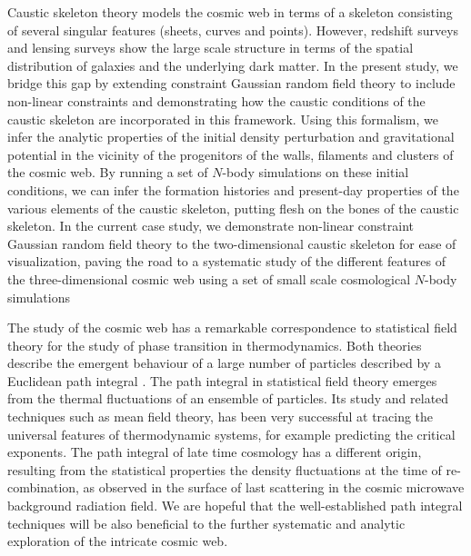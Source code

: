 \documentclass[a4paper, 11pt]{article}
\begin{document}
Caustic skeleton theory models the cosmic web in terms of a skeleton consisting of several singular features (sheets, curves and points). However, redshift surveys and lensing surveys show the large scale structure in terms of the spatial distribution of galaxies and the underlying dark matter. In the present study, we bridge this gap by extending constraint Gaussian random field theory to include non-linear constraints and demonstrating how the caustic conditions of the caustic skeleton are incorporated in this framework. Using this formalism, we infer the analytic properties of the initial density perturbation and gravitational potential in the vicinity of the progenitors of the walls, filaments and clusters of the cosmic web. By running a set of $N$-body simulations on these initial conditions, we can infer the formation histories and present-day properties of the various elements of the caustic skeleton, putting flesh on the bones of the caustic skeleton. In the current case study, we demonstrate non-linear constraint Gaussian random field theory to the two-dimensional caustic skeleton for ease of visualization, paving the road to a systematic study of the different features of the three-dimensional cosmic web using a set of small scale cosmological $N$-body simulations

The study of the cosmic web has a remarkable correspondence to statistical field theory for the study of phase transition in thermodynamics. Both theories describe the emergent behaviour of a large number of particles described by a Euclidean path integral \cite{Feynman:1965}. The path integral in statistical field theory emerges from the thermal fluctuations of an ensemble of particles. Its study and related techniques such as mean field theory, has been very successful at tracing the universal features of thermodynamic systems, for example predicting the critical exponents. The path integral of late time cosmology has a different origin, resulting from the statistical properties the density fluctuations at the time of re-combination, as observed in the surface of last scattering in the cosmic microwave background radiation field. We are hopeful that the well-established path integral techniques will be also beneficial to the further systematic and analytic exploration of the intricate cosmic web.
\end{document}
